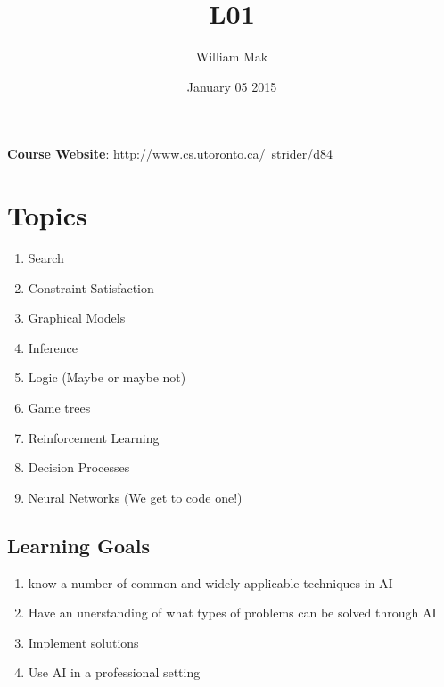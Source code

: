 \documentclass{article}
\title{L01}
\author{William Mak}
\date{January 05 2015}
\begin{document}
\maketitle
\textbf{Course Website}: http://www.cs.utoronto.ca/~strider/d84
\section{Topics}
\begin{enumerate}
	\item Search
	\item Constraint Satisfaction
	\item Graphical Models
	\item Inference
	\item Logic (Maybe or maybe not)
	\item Game trees
	\item Reinforcement Learning
	\item Decision Processes
	\item Neural Networks (We get to code one!)
\end{enumerate}
\subsection{Learning Goals}
\begin{enumerate}
	\item know a number of common and widely applicable techniques in AI
	\item Have an unerstanding of what types of problems can be solved through
		AI
	\item Implement solutions
	\item Use AI in a professional setting
\end{enumerate}
\end{document}
